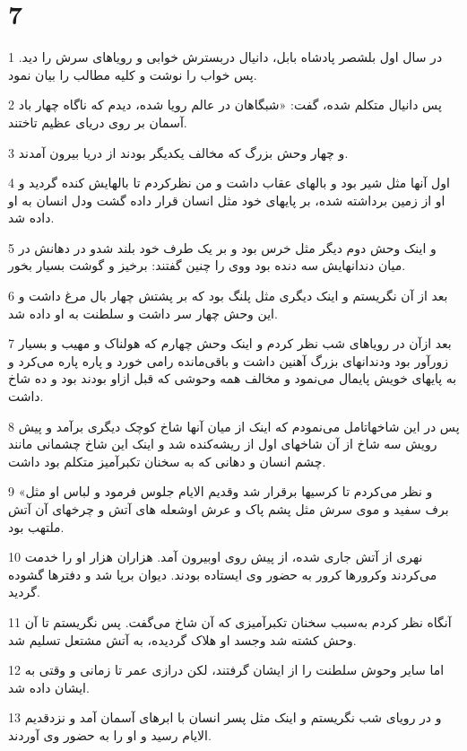 \chapter{7}

\par 1 در سال اول بلشصر پادشاه بابل، دانیال دربسترش خوابی و رویاهای سرش را دید. پس خواب را نوشت و کلیه مطالب را بیان نمود.
\par 2 پس دانیال متکلم شده، گفت: «شبگاهان در عالم رویا شده، دیدم که ناگاه چهار باد آسمان بر روی دریای عظیم تاختند.
\par 3 و چهار وحش بزرگ که مخالف یکدیگر بودند از دریا بیرون آمدند.
\par 4 اول آنها مثل شیر بود و بالهای عقاب داشت و من نظرکردم تا بالهایش کنده گردید و او از زمین برداشته شده، بر پایهای خود مثل انسان قرار داده گشت ودل انسان به او داده شد.
\par 5 و اینک وحش دوم دیگر مثل خرس بود و بر یک طرف خود بلند شدو در دهانش در میان دندانهایش سه دنده بود ووی را چنین گفتند: برخیز و گوشت بسیار بخور.
\par 6 بعد از آن نگریستم و اینک دیگری مثل پلنگ بود که بر پشتش چهار بال مرغ داشت و این وحش چهار سر داشت و سلطنت به او داده شد.
\par 7 بعد ازآن در رویاهای شب نظر کردم و اینک وحش چهارم که هولناک و مهیب و بسیار زورآور بود ودندانهای بزرگ آهنین داشت و باقی‌مانده رامی خورد و پاره پاره می‌کرد و به پایهای خویش پایمال می‌نمود و مخالف همه وحوشی که قبل ازاو بودند بود و ده شاخ داشت.
\par 8 پس در این شاخهاتامل می‌نمودم که اینک از میان آنها شاخ کوچک دیگری برآمد و پیش رویش سه شاخ از آن شاخهای اول از ریشه‌کنده شد و اینک این شاخ چشمانی مانند چشم انسان و دهانی که به سخنان تکبرآمیز متکلم بود داشت.
\par 9 «و نظر می‌کردم تا کرسیها برقرار شد وقدیم الایام جلوس فرمود و لباس او مثل برف سفید و موی سرش مثل پشم پاک و عرش اوشعله های آتش و چرخهای آن آتش ملتهب بود.
\par 10 نهری از آتش جاری شده، از پیش روی اوبیرون آمد. هزاران هزار او را خدمت می‌کردند وکرورها کرور به حضور وی ایستاده بودند. دیوان برپا شد و دفترها گشوده گردید.
\par 11 آنگاه نظر کردم به‌سبب سخنان تکبرآمیزی که آن شاخ می‌گفت. پس نگریستم تا آن وحش کشته شد وجسد او هلاک گردیده، به آتش مشتعل تسلیم شد.
\par 12 اما سایر وحوش سلطنت را از ایشان گرفتند، لکن درازی عمر تا زمانی و وقتی به ایشان داده شد.
\par 13 و در رویای شب نگریستم و اینک مثل پسر انسان با ابرهای آسمان آمد و نزدقدیم الایام رسید و او را به حضور وی آوردند.
